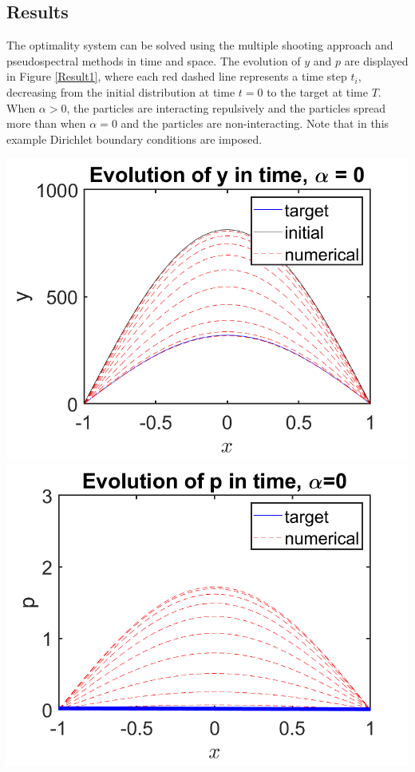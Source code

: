 \documentclass[a0,portrait]{a0poster}
\newcommand{\Sta}{y}
\newcommand{\Adj}{p}
\begin{document}
\begin{multicols}{2}
\section*{Results}
The optimality system can be solved using the multiple shooting approach and pseudospectral methods in time and space. The evolution of $\Sta$ and $\Adj$ are displayed in Figure \ref{Result1}, where each red dashed line represents a time step $t_i$, decreasing from the initial distribution at time $t=0$ to the target at time $T$. When $\alpha >0$, the particles are interacting repulsively and the particles spread more than when $\alpha=0$ and the particles are non-interacting. Note that in this example Dirichlet boundary conditions are imposed.

\begin{center}
		\includegraphics[scale=0.75]{Rhoalpha0.png}
		\includegraphics[scale=0.75]{qalpha0.png}

\end{center}
\end{multicols}
\end{document}
